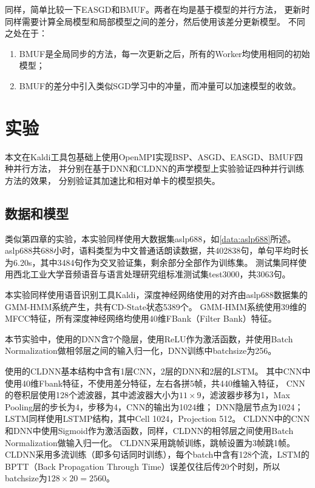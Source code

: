 同样，简单比较一下EASGD和BMUF。两者在均是基于模型的并行方法，
更新时同样需要计算全局模型和局部模型之间的差分，然后使用该差分更新模型。
不同之处在于：
\begin{enumerate}
\item BMUF是全局同步的方法，每一次更新之后，所有的Worker均使用相同的初始模型；
\item BMUF的差分中引入类似SGD学习中的冲量，而冲量可以加速模型的收敛。
\end{enumerate}

\section{实验}

本文在Kaldi工具包基础上使用OpenMPI实现BSP、ASGD、EASGD、BMUF四种并行方法，
并分别在基于DNN和CLDNN的声学模型上实验验证四种并行训练方法的效果，
分别验证其加速比和相对单卡的模型损失。

\subsection{数据和模型}

类似第四章的实验，本实验同样使用大数据集aslp688，如\ref{data:aslp688}所述。
aslp688共688小时，语料类型为中文普通话朗读数据，共402838句，单句平均时长为6.20s，其中3484句作为交叉验证集，剩余部分全部作为训练集。
测试集同样使用西北工业大学音频语音与语言处理研究组标准测试集test3000，共3063句。

本实验同样使用语音识别工具Kaldi，深度神经网络使用的对齐由aslp688数据集的GMM-HMM系统产生，共有CD-State状态5389个。
GMM-HMM系统使用39维的MFCC特征，所有深度神经网络均使用40维FBank（Filter Bank）特征。

本节实验中，使用的DNN含7个隐层，使用ReLU作为激活函数，并使用Batch Normalization做相邻层之间的输入归一化，DNN训练中batchsize为256。

使用的CLDNN基本结构中含有1层CNN，2层的DNN和2层的LSTM。
其中CNN中使用40维Fbank特征，不使用差分特征，左右各拼5帧，共440维输入特征，
CNN的卷积层使用128个滤波器，其中滤波器大小为$11 \times 9$，滤波器步移为1，Max Pooling层的步长为4，步移为4，CNN的输出为1024维；
DNN隐层节点为1024；LSTM同样使用LSTMP结构，其中Cell 1024，Projection 512。
CLDNN中的CNN和DNN中使用Sigmoid作为激活函数，同样，CLDNN的相邻层之间使用Batch Normalization做输入归一化。
CLDNN采用跳帧训练，跳帧设置为3帧跳1帧。
CLDNN采用多流训练（即多句话同时训练），每个batch中含有128个流，LSTM的BPTT（Back Propagation Through Time）误差仅往后传20个时刻，所以
batchsize为$128 \times 20 = 2560$。

